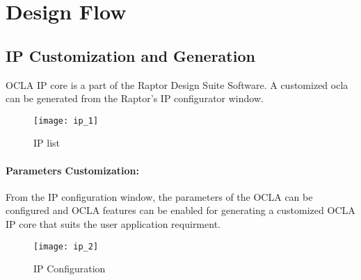 


\newpage

\section*{ \hfill Design Flow}



\subsection*{\fontsize{14}{16}\selectfont IP Customization and Generation}
OCLA IP core is a part of the Raptor Design Suite Software. A customized ocla can be generated from the Raptor's IP configurator window.
\begin{figure}[h]\centering %
	\texttt{[image: ip\_1]}
	\caption{IP list}
	\label{fig:ip_1}
\end{figure}
\newpage
\paragraph{Parameters Customization:}
From the IP configuration window, the parameters of the OCLA can be configured and OCLA features can be enabled for generating a customized OCLA IP core that suits the user application requirment.
\begin{figure}[h]\centering %
	\texttt{[image: ip\_2]}
	\caption{IP Configuration}
	\label{fig:ip_2}
\end{figure}



